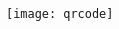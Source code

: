 \documentclass[10pt,A4]{article}
\newcommand{\mpwidth}{\linewidth-\fboxsep-\fboxsep}
\newcommand{\cvtext}[1] {
	\begin{tabular*}{1\mpwidth}{p{0.98\mpwidth}}
		\parbox{1\mpwidth}{#1}
	\end{tabular*}
}
\newcommand{\cvsection}[1] {
	\vspace{5pt}
	\cvtext{
		\textbf{\Large{\textcolor{darkcol}{\uppercase{#1}}}}\\[-4pt]
		\textcolor{maincol}{ \rule{0.1\textwidth}{2pt} } \\
	}
}
\newcommand{\cvmetaevent}[4] {
	\textcolor{maincol} {\cvtext{\textbf{\begin{flushleft}#1\end{flushleft}}}}

	\ifthenelse{\isempty{#2}}{}{
	\textcolor{darkcol} {\cvtext{\textbf{#2}} }
	}

	\ifthenelse{\isempty{#3}}{}{
		\cvtext{{ \textcolor{darkcol} {#3} }}\\
	}

	\cvtext{#4}\\[14pt]
}
\newcommand{\cvqrcode}[1] {
	\begin{center}
		\texttt{[image: qrcode]}
	\end{center}
}
\begin{document}
\begin{paracol}{2}
\begin{leftcolumn}
\vfill\null
\cvqrcode{0.8}

%
%
%
%
%

%
%
%
%
%
%


\end{leftcolumn}
\end{paracol}
\end{document}

